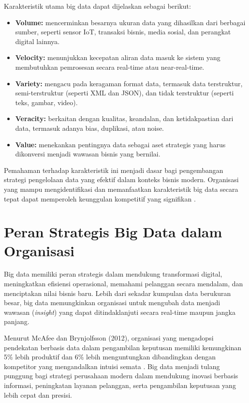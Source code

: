 Karakteristik utama big data dapat dijelaskan sebagai berikut:

\begin{itemize}
	\item \textbf{Volume:} mencerminkan besarnya ukuran data yang dihasilkan dari berbagai sumber, seperti sensor IoT, transaksi bisnis, media sosial, dan perangkat digital lainnya.
	\item \textbf{Velocity:} menunjukkan kecepatan aliran data masuk ke sistem yang membutuhkan pemrosesan secara real-time atau near-real-time.
	\item \textbf{Variety:} mengacu pada keragaman format data, termasuk data terstruktur, semi-terstruktur (seperti XML dan JSON), dan tidak terstruktur (seperti teks, gambar, video).
	\item \textbf{Veracity:} berkaitan dengan kualitas, keandalan, dan ketidakpastian dari data, termasuk adanya bias, duplikasi, atau noise.
	\item \textbf{Value:} menekankan pentingnya data sebagai aset strategis yang harus dikonversi menjadi wawasan bisnis yang bernilai.
\end{itemize}

Pemahaman terhadap karakteristik ini menjadi dasar bagi pengembangan strategi pengelolaan data yang efektif dalam konteks bisnis modern. Organisasi yang mampu mengidentifikasi dan memanfaatkan karakteristik big data secara tepat dapat memperoleh keunggulan kompetitif yang signifikan \cite{wamba2017}.



\section{Peran Strategis Big Data dalam Organisasi}

Big data memiliki peran strategis dalam mendukung transformasi digital, meningkatkan efisiensi operasional, memahami pelanggan secara mendalam, dan menciptakan nilai bisnis baru. Lebih dari sekadar kumpulan data berukuran besar, big data memungkinkan organisasi untuk mengubah data menjadi wawasan (\textit{insight}) yang dapat ditindaklanjuti secara real-time maupun jangka panjang.

Menurut McAfee dan Brynjolfsson (2012), organisasi yang mengadopsi pendekatan berbasis data dalam pengambilan keputusan memiliki kemungkinan 5\% lebih produktif dan 6\% lebih menguntungkan dibandingkan dengan kompetitor yang mengandalkan intuisi semata \cite{mcafee2012}. Big data menjadi tulang punggung bagi strategi perusahaan modern dalam mendukung inovasi berbasis informasi, peningkatan layanan pelanggan, serta pengambilan keputusan yang lebih cepat dan presisi.

